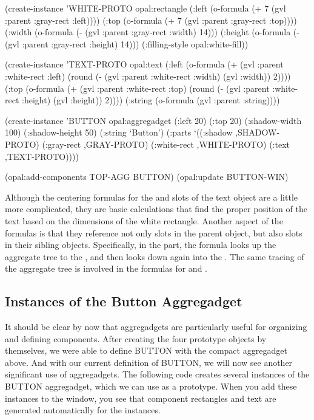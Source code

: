 \begin{programexample}
(create-instance 'WHITE-PROTO opal:rectangle
   (:left (o-formula (+ 7 (gvl :parent :gray-rect :left))))
   (:top (o-formula (+ 7 (gvl :parent :gray-rect :top))))
   (:width (o-formula (- (gvl :parent :gray-rect :width) 14)))
   (:height (o-formula (- (gvl :parent :gray-rect :height) 14)))
   (:filling-style opal:white-fill))

(create-instance 'TEXT-PROTO opal:text
   (:left (o-formula (+ (gvl :parent :white-rect :left)
			(round (- (gvl :parent :white-rect :width)
				  (gvl :width))
			       2))))
   (:top (o-formula (+ (gvl :parent :white-rect :top)
		       (round (- (gvl :parent :white-rect :height)
				 (gvl :height))
			      2))))
   (:string (o-formula (gvl :parent :string))))

(create-instance 'BUTTON opal:aggregadget
   (:left 20) (:top 20)
   (:shadow-width 100) (:shadow-height 50)
   (:string `Button')
   (:parts
    `((:shadow ,SHADOW-PROTO)
      (:gray-rect ,GRAY-PROTO)
      (:white-rect ,WHITE-PROTO)
      (:text ,TEXT-PROTO))))

(opal:add-components TOP-AGG BUTTON)
(opal:update BUTTON-WIN)
\end{programexample}

Although the centering formulas for the  and  slots
of the text object are a little more complicated, they are basic
calculations that find the proper position of the text based on the
dimensions of the white rectangle.  Another aspect of the formulas is
that they reference not only slots in the parent object, but also
slots in their sibling objects.  Specifically, in the 
part, the  formula looks up the aggregate tree to the
, and then looks down again into the .  The
same tracing of the aggregate tree is involved in the 
formulas for  and .


\subsection{Instances of the Button Aggregadget}

It should be clear by now that aggregadgets are particularly useful
for organizing and defining components.  After creating the four
prototype objects by themselves, we were able to define BUTTON with
the compact aggregadget above.  And with our current definition of
BUTTON, we will now see another significant use of aggregadgets.  The
following code creates several instances of the BUTTON aggregadget,
which we can use as a prototype.  When you add these instances to the
window, you see that component rectangles and text are generated
automatically for the instances.


